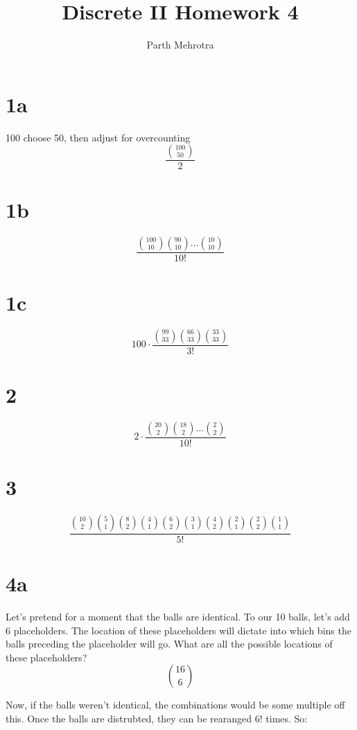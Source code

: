 \documentclass{article}
\begin{document}
	\title{Discrete II Homework 4}
	\author{Parth Mehrotra}
	\maketitle

	\setlength{\parindent}{0cm} {
		\section*{\Large{\textbf{1a}}}
			100 choose 50, then adjust for overcounting
			\[ 
				\frac{ {100 \choose 50} }{2} 
			\]

		\section*{\Large{\textbf{1b}}}
			\[
				\frac { \binom{100}{10} \binom{90}{10} \ldots \binom{10}{10} } { 10! }
			\]

		\section*{\Large{\textbf{1c}}}
			\[
				100 \cdot \frac{ \binom{99}{33} \binom{66}{33} \binom{33}{33} } { 3! }
			\]

		\section*{\Large{\textbf{2}}}
			\[
				2 \cdot \frac{ \binom{20}{2} \binom{18}{2} \ldots \binom{2}{2} } { 10! }
			\]

		\section*{\Large{\textbf{3}}}
			\[
				\frac { \binom{10}{2} \binom{5}{1} \binom{8}{2} \binom{4}{1} \binom{6}{2} \binom{3}{1} \binom{4}{2} \binom{2}{1} \binom{2}{2} \binom{1}{1} } { 5! }
			\]
	
		\section*{\Large{\textbf{4a}}}
			Let's pretend for a moment that the balls are identical. To our 10 balls, let's add 6 placeholders. The location of these placeholders will dictate into which bins the balls preceding the placeholder will go. What are all the possible locations of these placeholders?
			\[
				\binom{16}{6}
			\]

			Now, if the balls weren't identical, the combinations would be some multiple off this. Once the balls are distrubted, they can be rearanged $6!$ times. So:
			
}
\end{document}
